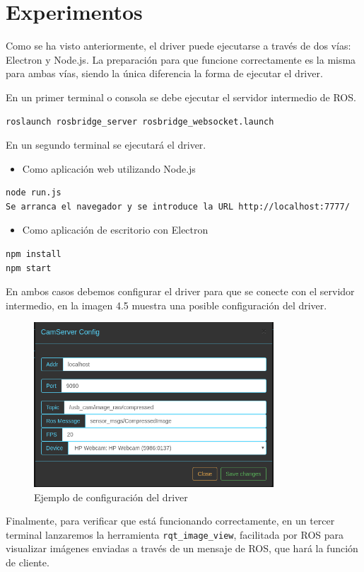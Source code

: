 \section{Experimentos}
Como se ha visto anteriormente, el driver puede ejecutarse a través de dos vías: Electron y Node.js. La preparación para que funcione correctamente es la misma para ambas vías, siendo la única diferencia la forma de ejecutar el driver.

En un primer terminal o consola se debe ejecutar el servidor intermedio de ROS.

\begin{lstlisting}[caption= Ejecución del servidor intermedio, label=cod.servidorintermedio]
roslaunch rosbridge_server rosbridge_websocket.launch
\end{lstlisting}
En un segundo terminal se ejecutará el driver.
\begin{itemize}
\item 
Como aplicación web utilizando Node.js
\end{itemize}
\begin{lstlisting}[caption= Ejecución con Node.js, label=cod.nodejs]
node run.js
Se arranca el navegador y se introduce la URL http://localhost:7777/
\end{lstlisting}
\begin{itemize}
\item 
Como aplicación de escritorio con Electron
\end{itemize}
\begin{lstlisting}[caption= Ejecución con Electron, label=cod.electron]
npm install
npm start
\end{lstlisting}
En ambos casos debemos configurar el driver para que se conecte con el servidor intermedio, en la imagen 4.5 muestra una posible configuración del driver.
\begin{figure}[H]
  \begin{center}
    \includegraphics[width=0.8\textwidth]{figures/configcamservertest.png}
		\caption{Ejemplo de configuración del driver}
		\label{fig.esquemacamserver}
		\end{center}
\end{figure}
Finalmente, para verificar que está funcionando correctamente, en un tercer terminal lanzaremos la herramienta \texttt{rqt\_image\_view}, facilitada por ROS para visualizar imágenes enviadas a través de un mensaje de ROS, que hará la función de cliente.

